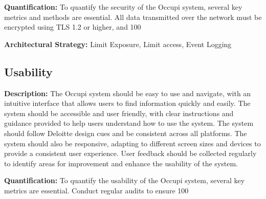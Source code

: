 \documentclass[11pt,a4paper]{article}
\begin{document}
\textbf{Quantification:} To quantify the security of the Occupi system, several key metrics and methods are essential. All data transmitted over the network must be encrypted using TLS 1.2 or higher, and 100%

\textbf{Architectural Strategy:} Limit Exposure, Limit access, Event Logging

\subsection*{Usability}
\textbf{Description:} The Occupi system should be easy to use and navigate, with an intuitive interface that allows users to find information quickly and easily. The system should be accessible and user friendly, with clear instructions and guidance provided to help users understand how to use the system. The system should follow Deloitte design cues and be consistent across all platforms. The system should also be responsive, adapting to different screen sizes and devices to provide a consistent user experience. User feedback should be collected regularly to identify areas for improvement and enhance the usability of the system.

\textbf{Quantification:} To quantify the usability of the Occupi system, several key metrics are essential. Conduct regular audits to ensure 100%
\end{document}
